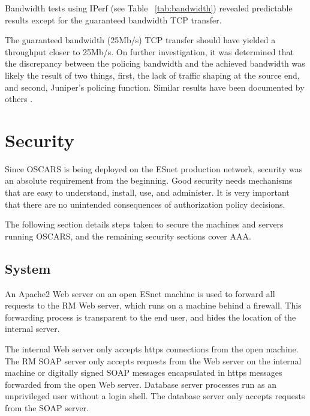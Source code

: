 \documentclass[conference]{IEEEtran}
\begin{document}
Bandwidth tests using IPerf \cite{iperf} (see Table ~\ref{tab:bandwidth}) revealed
predictable results except for the guaranteed bandwidth TCP transfer.

The guaranteed bandwidth (25Mb/s) TCP transfer should have yielded a 
throughput closer to 25Mb/s.  On further investigation, it was determined 
that the 
discrepancy between the policing bandwidth and the achieved bandwidth was 
likely the result of two things, first, the lack of traffic shaping at the 
source end, and second, Juniper's policing function.  Similar results have 
been documented by others \cite{martelli}.


\section{Security}
Since OSCARS is being deployed on the ESnet production network, security was 
an absolute requirement from the beginning. Good security needs mechanisms that are easy to understand, install, use, and administer. It is very important that there
are no unintended consequences of authorization policy decisions.

The following section details steps taken to secure the machines and 
servers running OSCARS, and the remaining security sections cover AAA.

\subsection{System}

An Apache2 Web server on an open ESnet machine is used to forward all 
requests to the RM Web server, which runs on a machine behind a firewall. 
This forwarding process is transparent to the end user, and hides the location 
of the internal server.

The internal Web server only accepts https connections from the open machine.
The RM SOAP server only accepts requests from the Web server on the internal 
machine
or digitally signed SOAP messages encapsulated in https messages forwarded from the open Web server.
Database server processes run as an unprivileged user without a login 
shell.  The database server only accepts requests from the SOAP server.
\end{document}
